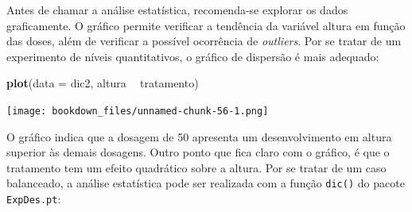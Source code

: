 \documentclass[
]{article}
\newenvironment{Shaded}{\begin{snugshade}}{\end{snugshade}}
\newcommand{\DataTypeTok}[1]{\textcolor[rgb]{0.13,0.29,0.53}{#1}}
\newcommand{\KeywordTok}[1]{\textcolor[rgb]{0.13,0.29,0.53}{\textbf{#1}}}
\newcommand{\NormalTok}[1]{#1}
\newcommand{\OperatorTok}[1]{\textcolor[rgb]{0.81,0.36,0.00}{\textbf{#1}}}
\newcommand{\OtherTok}[1]{\textcolor[rgb]{0.56,0.35,0.01}{#1}}
\newcommand{\StringTok}[1]{\textcolor[rgb]{0.31,0.60,0.02}{#1}}
\begin{document}
Antes de chamar a análise estatística, recomenda-se explorar os dados graficamente. O gráfico permite verificar a tendência da variável altura em função das doses, além de verificar a possível ocorrência de \emph{outliers}. Por se tratar de um experimento de níveis quantitativos, o gráfico de dispersão é mais adequado:

\begin{Shaded}
\begin{Highlighting}[]
\KeywordTok{plot}\NormalTok{(}\DataTypeTok{data =}\NormalTok{ dic2, altura }\OperatorTok{~}\StringTok{ }\NormalTok{tratamento)}
\end{Highlighting}
\end{Shaded}

\texttt{[image: bookdown\_files/unnamed-chunk-56-1.png]}

O gráfico indica que a dosagem de 50 apresenta um desenvolvimento em altura superior às demais dosagens. Outro ponto que fica claro com o gráfico, é que o tratamento tem um efeito quadrático sobre a altura. Por se tratar de um caso balanceado, a análise estatística pode ser realizada com a função \texttt{dic()} do pacote \texttt{ExpDes.pt}:

\begin{Shaded}
\end{Shaded}
\end{document}
